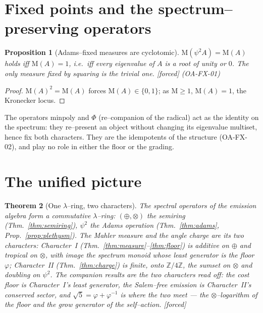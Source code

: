 \documentclass[11pt]{article}
\newcommand{\stag}[1]{{\small\textsf{\textcolor{tagcol}{[#1]}}}}
\newcommand{\bk}[1]{{\small\textsf{(#1)}}}
\theoremstyle{plain}
\newtheorem{theorem}{Theorem}[section]
\newtheorem{proposition}[theorem]{Proposition}
\theoremstyle{definition}
\newcommand{\Z}{\mathbb{Z}}
\newcommand{\psitwo}{\psi^{2}}
\newcommand{\dsum}{\oplus}
\newcommand{\dten}{\otimes}
\newcommand{\Mahler}{\mathrm{M}}
\begin{document}
\section{Fixed points and the spectrum--preserving operators}\label{sec:fixed}

\begin{proposition}[Adams--fixed measures are cyclotomic]\label{prop:fixed}
$\Mahler(\psitwo A)=\Mahler(A)$ holds iff $\Mahler(A)=1$, i.e.\ iff every eigenvalue of $A$ is a root of unity or $0$. The only measure fixed by squaring is the trivial one. \stag{forced} \bk{OA-FX-01}
\end{proposition}

\begin{proof}
$\Mahler(A)^2=\Mahler(A)$ forces $\Mahler(A)\in\{0,1\}$; as $\Mahler\ge1$, $\Mahler(A)=1$, the Kronecker locus.
\end{proof}

The operators $\mathrm{minpoly}$ and $\Phi$ (re--companion of the radical) act as the identity on the spectrum: they re--present an object without changing its eigenvalue multiset, hence fix both characters. They are the idempotents of the structure \bk{OA-FX-02}, and play no role in either the floor or the grading.

\section{The unified picture}\label{sec:unified}

\begin{theorem}[One $\lambda$--ring, two characters]\label{thm:unified}
The spectral operators of the emission algebra form a commutative $\lambda$--ring: $(\dsum,\dten)$ the semiring (Thm.~\ref{thm:semiring}), $\psitwo$ the Adams operation (Thm.~\ref{thm:adams}, Prop.~\ref{prop:plethysm}). The Mahler measure and the angle charge are its two characters: Character~I (Thm.~\ref{thm:measure}--\ref{thm:floor}) is additive on $\dsum$ and tropical on $\dten$, with image the spectrum monoid whose least generator is the floor $\varphi$; Character~II (Thm.~\ref{thm:charge}) is finite, onto $\Z/4\Z$, the sumset on $\dten$ and doubling on $\psitwo$. The companion results are the two characters read off: the cost floor is Character~I's least generator, the Salem--free emission is Character~II's conserved sector, and $\sqrt5=\varphi+\varphi^{-1}$ is where the two meet --- the $\dten$--logarithm of the floor and the grow generator of the self--action. \stag{forced}
\end{theorem}
\end{document}
